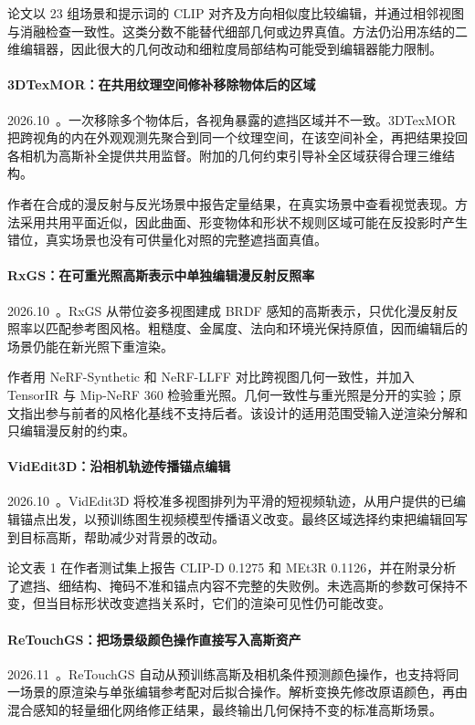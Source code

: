论文以 23 组场景和提示词的 CLIP 对齐及方向相似度比较编辑，并通过相邻视图与消融检查一致性。这类分数不能替代细部几何或边界真值。方法仍沿用冻结的二维编辑器，因此很大的几何改动和细粒度局部结构可能受到编辑器能力限制。

\paragraph{3DTexMOR：在共用纹理空间修补移除物体后的区域}
2026.10~\cite{2610_11198}。一次移除多个物体后，各视角暴露的遮挡区域并不一致。3DTexMOR 把跨视角的内在外观观测先聚合到同一个纹理空间，在该空间补全，再把结果投回各相机为高斯补全提供共用监督。附加的几何约束引导补全区域获得合理三维结构。

作者在合成的漫反射与反光场景中报告定量结果，在真实场景中查看视觉表现。方法采用共用平面近似，因此曲面、形变物体和形状不规则区域可能在反投影时产生错位，真实场景也没有可供量化对照的完整遮挡面真值。

\paragraph{RxGS：在可重光照高斯表示中单独编辑漫反射反照率}
2026.10~\cite{2610_25681}。RxGS 从带位姿多视图建成 BRDF 感知的高斯表示，只优化漫反射反照率以匹配参考图风格。粗糙度、金属度、法向和环境光保持原值，因而编辑后的场景仍能在新光照下重渲染。

作者用 NeRF-Synthetic 和 NeRF-LLFF 对比跨视图几何一致性，并加入 TensorIR 与 Mip-NeRF 360 检验重光照。几何一致性与重光照是分开的实验；原文指出参与前者的风格化基线不支持后者。该设计的适用范围受输入逆渲染分解和只编辑漫反射的约束。

\paragraph{VidEdit3D：沿相机轨迹传播锚点编辑}
2026.10~\cite{2610_35756}。VidEdit3D 将校准多视图排列为平滑的短视频轨迹，从用户提供的已编辑锚点出发，以预训练图生视频模型传播语义改变。最终区域选择约束把编辑回写到目标高斯，帮助减少对背景的改动。

论文表 1 在作者测试集上报告 CLIP-D 0.1275 和 MEt3R 0.1126，并在附录分析了遮挡、细结构、掩码不准和锚点内容不完整的失败例。未选高斯的参数可保持不变，但当目标形状改变遮挡关系时，它们的渲染可见性仍可能改变。

\paragraph{ReTouchGS：把场景级颜色操作直接写入高斯资产}
2026.11~\cite{2611_23054}。ReTouchGS 自动从预训练高斯及相机条件预测颜色操作，也支持将同一场景的原渲染与单张编辑参考配对后拟合操作。解析变换先修改原语颜色，再由混合感知的轻量细化网络修正结果，最终输出几何保持不变的标准高斯场景。

